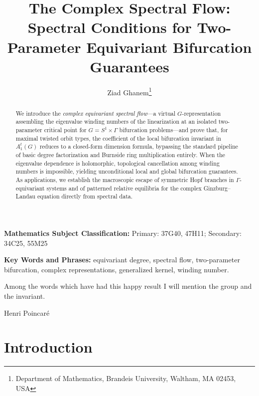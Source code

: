 \documentclass[twoside,11pt]{article}
\def\noi{\noindent}
\begin{document}
\title{The Complex Spectral Flow: Spectral Conditions for Two-Parameter Equivariant Bifurcation Guarantees} 

\author{
Ziad Ghanem\thanks{\small Department of Mathematics, Brandeis University, Waltham, MA 02453, USA
}}
\date{}

\maketitle

\begin{abstract}
We introduce the \emph{complex equivariant spectral flow}---a virtual $G$-representation assembling the eigenvalue winding numbers of the linearization at an isolated two-parameter 
critical point for $G = S^1 \times \Gamma$ bifurcation problems---and prove that, for maximal twisted orbit types, the coefficient of the local bifurcation invariant in $A_1^t(G)$ reduces to a closed-form dimension formula, 
bypassing the standard pipeline of basic degree factorization and Burnside ring multiplication entirely.
%
When the eigenvalue dependence is holomorphic, topological cancellation among winding numbers is impossible, yielding unconditional local and global bifurcation guarantees.
%
As applications, we establish the macroscopic escape of symmetric Hopf branches in $\Gamma$-equivariant systems and of patterned relative equilibria for the complex Ginzburg--Landau equation directly from spectral data.
\end{abstract}

\noi \textbf{Mathematics Subject Classification:} Primary: 37G40, 47H11; Secondary: 34C25, 55M25

\medskip

\noi \textbf{Key Words and Phrases:} equivariant degree, spectral flow, two-parameter bifurcation, complex representations, generalized kernel, winding number.

\setlength{\epigraphwidth}{0.54\textwidth}
\epigraph{Among the words which have had this happy result I will mention the group and the invariant.}{Henri Poincaré}


\section{Introduction} \label{sec:intro}
\end{document}
